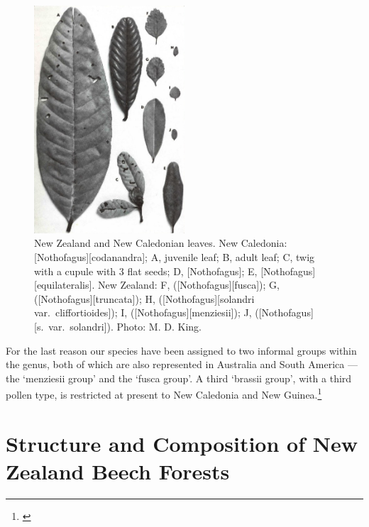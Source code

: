 \begin{figure}
	\includegraphics[width=0.5\textwidth]{graphics/fig_070}
	\centering
	\caption[New Zealand and New Caledonian Nothofagus leaves]{New Zealand and New Caledonian  leaves.
	New Caledonia: [Nothofagus][codanandra];
	A, juvenile leaf;
	B, adult leaf;
	C, twig with a cupule with 3 flat seeds;
	D, [Nothofagus];
	E, [Nothofagus][equilateralis].
	New Zealand:
	F,  ([Nothofagus][fusca]);
	G,  ([Nothofagus][truncata]);
	H,  ([Nothofagus][solandri var.\ cliffortioides]);
	I,  ([Nothofagus][menziesii]);
	J,  ([Nothofagus][s.\ var.\ solandri]).
	Photo: M. D. King.}%
	\label{fig:70nothofagus}
\end{figure}

For the last reason our species have been assigned to two informal groups within the genus, both of which are also represented in Australia and South America --- the `menziesii group' and the `fusca group'.
A third `brassii group', with a third pollen type, is restricted at present to New Caledonia and New Guinea.\footnote{\cite{cranwell1939southern}}

\section{Structure and Composition of New Zealand Beech Forests}

